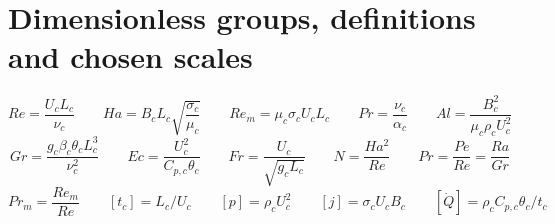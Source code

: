 \documentclass[11pt]{article}
\begin{document}
\section{Dimensionless groups, definitions and chosen scales}
\begin{equation}
	Re = \frac{U_c L_c}{\nu_c} \qquad
	Ha = B_c L_c \sqrt{\frac{\sigma_c}{\mu_c}} \qquad
	Re_m = \mu_c \sigma_c U_c L_c \qquad
	Pr = \frac{\nu_c}{\alpha_c} \qquad
	Al = \frac{B_c^2}{\mu_c \rho_c U_c^2} \qquad
\end{equation}
\begin{equation}
	Gr = \frac{g_c \beta_c \theta_c L_c^3}{\nu_c^2} \qquad
	Ec = \frac{U_c^2}{C_{p,c} \theta_c} \qquad
	Fr = \frac{U_c}{\sqrt{g_c L_c}} \qquad
	N = \frac{Ha^2}{Re} \qquad
	Pr = \frac{Pe}{Re}=\frac{Ra}{Gr}
\end{equation}
\begin{equation}
	Pr_{m} = \frac{Re_m}{Re} \qquad
	[t_c] = L_c/U_c \qquad
	[p] = \rho_c U_c^2 \qquad
	[j] = \sigma_c U_c B_c \qquad
	[\dot{Q}] = \rho_c C_{p,c} \theta_c / t_c
\end{equation}
\end{document}
